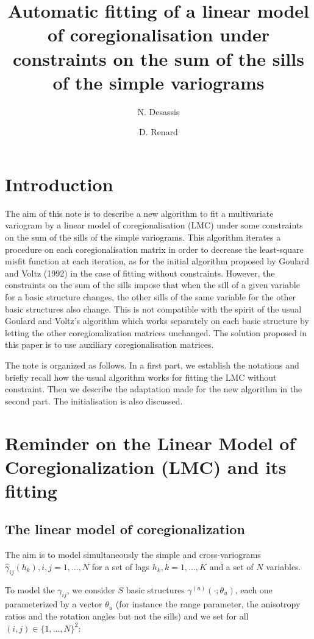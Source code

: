 \documentclass[11pt]{article}
\title{Automatic fitting of a linear model of coregionalisation under constraints on the sum of the sills of the simple variograms}
\author[1]{N. Desassis}
\author[2]{D. Renard}
\affil[1]{Université Paris Sciences et Lettres}
\affil[2]{MINES ParisTech, PSL Research University}
\date{}
\begin{document}
\maketitle

\section{Introduction}

The aim of this note is to describe a new algorithm to fit a multivariate variogram by a linear model of coregionalisation (LMC) under some constraints on the sum of the sills of the simple variograms. This algorithm iterates a procedure on each coregionalisation matrix in order to decrease the least-square misfit function at each iteration, as for the initial algorithm proposed by Goulard and Voltz (1992) in the case of fitting without constraints. However, the constraints on the sum of the sills impose that when the sill of a given variable for a basic structure changes, the other sills of the same variable for the other basic structures also change. This is not compatible with the spirit of the usual Goulard and Voltz’s algorithm which works separately on each basic structure by letting the other coregionalization matrices unchanged. The solution proposed in this paper is to use auxiliary coregionalisation matrices.

The note is organized as follows. In a first part, we establish the notations and briefly recall how the usual algorithm works for fitting the LMC without constraint. Then we describe the adaptation made for the new algorithm in the second part. The initialisation is also discussed.


\section{Reminder on the Linear Model of Coregionalization (LMC) and its fitting}

\subsection{The linear model of coregionalization}

The aim is to model simultaneously the simple and cross-variograms $\hat{\gamma}_{ij}(h_k), i, j = 1, \ldots, N$ for a set of lags $h_k, k = 1, \ldots, K$ and a set of $N$ variables.

To model the $\gamma_{ij}$, we consider $S$ basic structures $\gamma^{(u)}(\cdot; \theta_u)$, each one parameterized by a vector $\theta_u$ (for instance the range parameter, the anisotropy ratios and the rotation angles but not the sills) and we set for all $(i,j) \in \{1, \ldots, N\}^2$:
\end{document}
